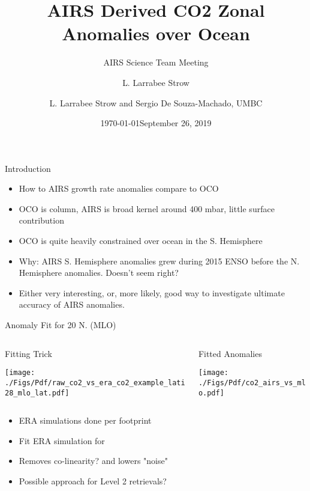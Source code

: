 \documentclass[10pt,t]{beamer}
\author{L. Larrabee Strow}
\date{\today}
\title{\large AIRS Derived CO2 Zonal Anomalies over Ocean}
\subtitle{\footnotesize{AIRS Science Team Meeting}}
\date{\vspace{0.1in}\footnotesize{September 26, 2019\vfill}}
\author{L. Larrabee Strow\inst{1,2} and Sergio De Souza-Machado, UMBC\inst{1,2}}
\institute[UMBC]{\inst{1} UMBC Physics Dept. \and \inst{2}UMBC JCET}
\begin{document}
\maketitle
{}

\begin{frame}[label={sec:orgf59adbe}]{Introduction}
\begin{itemize}
\item How to AIRS growth rate anomalies compare to OCO
\item OCO is column, AIRS is broad kernel around 400 mbar, little surface contribution
\item OCO is quite heavily constrained over ocean in the S. Hemisphere
\item Why: AIRS S. Hemisphere anomalies grew during 2015 ENSO before the N. Hemisphere anomalies.  Doesn't seem right?
\item Either very interesting, or, more likely, good way to investigate ultimate accuracy of AIRS \cd anomalies.
\end{itemize}
\end{frame}

\begin{frame}[label={sec:org0403de0}]{\cd Anomaly Fit for 20\textdegree{} N. (MLO)}
\vspace{-0.3in}
\begin{columns}
\begin{column}{0.55\columnwidth}
\begin{block}{\footnotesize Fitting Trick}
\begin{center}
\texttt{[image: ./Figs/Pdf/raw\_co2\_vs\_era\_co2\_example\_lati28\_mlo\_lat.pdf]}
\end{center}
\end{block}
\end{column}

\begin{column}{0.55\columnwidth}
\begin{block}{\footnotesize Fitted \cd Anomalies}
\begin{center}
\texttt{[image: ./Figs/Pdf/co2\_airs\_vs\_mlo.pdf]}
\end{center}
\end{block}
\end{column}
\end{columns}

\begin{footnotesize}
\begin{itemize}
\item ERA simulations done per footprint
\item Fit ERA simulation for \cd
\item Removes co-linearity? and lowers "noise"
\item Possible approach for Level 2 \cd retrievals?
\end{itemize}
\end{footnotesize}
\end{frame}
\end{document}
